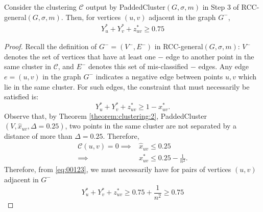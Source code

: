 \begin{lemma} \label{lemma:6.7}
Consider the clustering $\mathcal{C}$ output by {\sf PaddedCluster}$(G,\sigma,m)$ in Step 3 of {\sf RCC-general}$(G,\sigma,m)$. Then, for vertices $(u,v)$ adjacent in the graph $G^-$,
\begin{align*}
    Y_u^* + Y_v^*+ z_{uv}^* \ge 0.75
\end{align*}
\end{lemma}
\begin{proof}
Recall the definition of $G^- = (V^-, E^-)$ in {\sf RCC-general}$(G,\sigma,m)$: $V^-$ denotes the set of vertices that have at least one $-$ edge to another point in the same cluster in $\mathcal{C}$, and $E^-$ denotes this set of mis-classified $-$ edges. Any edge $e = (u,v)$ in the graph $G^-$ indicates a negative edge between points $u,v$ which lie in the same cluster. For such edges, the constraint that must necessarily be satisfied is:
	\begin{equation} \label{eq:00123}
        Y_u^* + Y_v^* + z_{uv}^* \ge 1 - x^*_{uv}.
	\end{equation}
	Observe that, by Theorem \ref{theorem:clustering:2}, {\sf PaddedCluster}$(V,\hat{x}_{uv},\Delta = 0.25)$, two points in the same cluster are not separated by a distance of more than $\Delta = 0.25$. Therefore,
	\begin{align*}
	\mathcal{C} (u,v) = 0 \implies &\hat{x}_{uv} \le 0.25\\ \implies &x_{uv}^* \le 0.25 - \frac{1}{n^2}.
	\end{align*}
	Therefore, from \eqref{eq:00123}, we must necessarily have for pairs of vertices $(u,v)$ adjacent in $G^-$
	\begin{equation} \label{eq:006}
		Y_u^* + Y_v^* + z_{uv}^* \ge 0.75 + \frac{1}{n^2} \ge 0.75
	\end{equation}
\end{proof}

